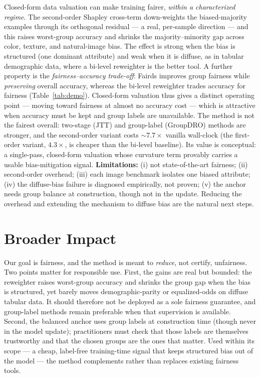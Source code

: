 \documentclass[letterpaper]{article}
\begin{document}
Closed-form data valuation can make training fairer, \emph{within a characterized
regime}. The second-order Shapley cross-term down-weights the biased-majority
examples through its orthogonal residual --- a real, per-sample direction --- and
this raises worst-group accuracy and shrinks the majority--minority gap across
color, texture, and natural-image bias. The effect is strong when the bias is
structured (one dominant attribute) and weak when it is diffuse, as in tabular
demographic data, where a bi-level reweighter is the better tool. A further property is the
\emph{fairness--accuracy trade-off}: Fairds improves group fairness while
\emph{preserving} overall accuracy, whereas the bi-level reweighter trades
accuracy for fairness (Table~\ref{tab:demo}). Closed-form valuation thus gives a
distinct operating point --- moving toward fairness at almost no accuracy cost ---
which is attractive when accuracy must be kept and group labels are unavailable. The method is
not the fairest overall: two-stage (JTT) and group-label (GroupDRO) methods are
stronger, and the second-order variant costs ${\sim}7.7\times$ vanilla wall-clock
(the first-order variant, $4.3\times$, is cheaper than the bi-level baseline). Its
value is conceptual: a single-pass, closed-form valuation whose curvature term
provably carries a usable bias-mitigation signal. \textbf{Limitations:} (i) not
state-of-the-art fairness; (ii) second-order overhead; (iii) each image benchmark
isolates one biased attribute; (iv) the diffuse-bias failure is diagnosed
empirically, not proven; (v) the anchor needs group balance at construction,
though not in the update. Reducing the overhead and extending the mechanism to
diffuse bias are the natural next steps.

\section{Broader Impact}
Our goal is fairness, and the method is meant to \emph{reduce}, not certify,
unfairness. Two points matter for responsible use. First, the gains are real but
bounded: the reweighter raises worst-group accuracy and shrinks the group gap when
the bias is structured, yet barely moves demographic-parity or equalized-odds on
diffuse tabular data. It should therefore not be deployed as a sole fairness
guarantee, and group-label methods remain preferable when that supervision is
available. Second, the balanced anchor uses group labels at construction time
(though never in the model update); practitioners must check that those labels are
themselves trustworthy and that the chosen groups are the ones that matter. Used
within its scope --- a cheap, label-free training-time signal that keeps
structured bias out of the model --- the method complements rather than replaces
existing fairness tools.

\clearpage

\end{document}
